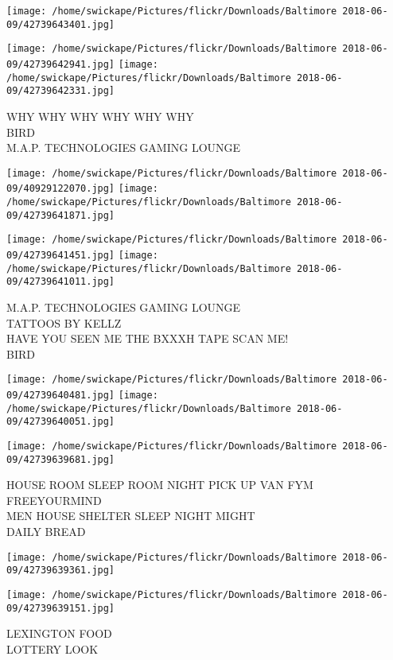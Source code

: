 \documentclass[10pt,letterpaper]{article}
\begin{document}
\texttt{[image: /home/swickape/Pictures/flickr/Downloads/Baltimore 2018-06-09/42739643401.jpg]}

\vspace{0.25in}
\texttt{[image: /home/swickape/Pictures/flickr/Downloads/Baltimore 2018-06-09/42739642941.jpg]}
\texttt{[image: /home/swickape/Pictures/flickr/Downloads/Baltimore 2018-06-09/42739642331.jpg]}

WHY WHY WHY WHY WHY WHY\\
BIRD\\
M.A.P. TECHNOLOGIES GAMING LOUNGE
\pagebreak

\texttt{[image: /home/swickape/Pictures/flickr/Downloads/Baltimore 2018-06-09/40929122070.jpg]}
\texttt{[image: /home/swickape/Pictures/flickr/Downloads/Baltimore 2018-06-09/42739641871.jpg]}

\texttt{[image: /home/swickape/Pictures/flickr/Downloads/Baltimore 2018-06-09/42739641451.jpg]}
\texttt{[image: /home/swickape/Pictures/flickr/Downloads/Baltimore 2018-06-09/42739641011.jpg]}

M.A.P. TECHNOLOGIES GAMING LOUNGE\\
TATTOOS BY KELLZ\\
HAVE YOU SEEN ME THE BXXXH TAPE SCAN ME!\\
BIRD
\pagebreak

\texttt{[image: /home/swickape/Pictures/flickr/Downloads/Baltimore 2018-06-09/42739640481.jpg]}
\texttt{[image: /home/swickape/Pictures/flickr/Downloads/Baltimore 2018-06-09/42739640051.jpg]}

\texttt{[image: /home/swickape/Pictures/flickr/Downloads/Baltimore 2018-06-09/42739639681.jpg]}

HOUSE ROOM SLEEP ROOM NIGHT PICK UP VAN FYM FREEYOURMIND\\
MEN HOUSE SHELTER SLEEP NIGHT MIGHT\\
DAILY BREAD
\pagebreak

\texttt{[image: /home/swickape/Pictures/flickr/Downloads/Baltimore 2018-06-09/42739639361.jpg]}

\vspace{0.25in}
\texttt{[image: /home/swickape/Pictures/flickr/Downloads/Baltimore 2018-06-09/42739639151.jpg]}

LEXINGTON FOOD\\
LOTTERY LOOK
\pagebreak
\end{document}
